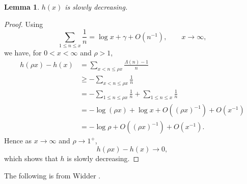 \documentclass{article}
\newtheorem{lemma}[theorem]{Lemma}
\begin{document}
\begin{lemma}
$h(x)$ is slowly decreasing.
\end{lemma}
\begin{proof}
Using
\[
\sum_{1 \leq n \leq x} \frac{1}{n} = \log x + \gamma + O(n^{-1}), \qquad x \to \infty,
\]
we have, for $0<x<\infty$ and $\rho>1$,
\begin{align*}
h(\rho x)-h(x)&=\sum_{x<n \leq \rho x} \frac{\Lambda(n)-1}{n}\\
&\geq -\sum_{x<n \leq \rho x} \frac{1}{n}\\
&=-\sum_{1 \leq n \leq \rho x} \frac{1}{n} + \sum_{1 \leq n \leq x} \frac{1}{n}\\
&=-\log(\rho x) +  \log x + O((\rho x)^{-1})  + O(x^{-1})\\
&=-\log \rho + O((\rho x)^{-1})  + O(x^{-1}).
\end{align*}
Hence as $x \to \infty$ and $\rho \to 1^+$, 
\[
h(\rho x)-h(x) \to 0,
\]
which shows that $h$ is slowly decreasing.
\end{proof}



The following is from Widder \cite[pp.~231--232]{widder}.
\end{document}
